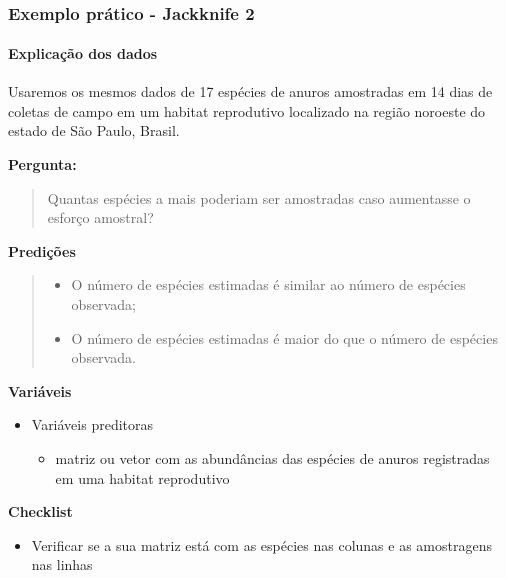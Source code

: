 \documentclass[
]{book}
\providecommand{\tightlist}{%
  \setlength{\itemsep}{0pt}\setlength{\parskip}{0pt}}
\begin{document}
~

\hypertarget{exemplo-pruxe1tico---jackknife-2}{%
\subsubsection{Exemplo prático - Jackknife 2}\label{exemplo-pruxe1tico---jackknife-2}}

\hypertarget{explicauxe7uxe3o-dos-dados-4}{%
\paragraph{Explicação dos dados}\label{explicauxe7uxe3o-dos-dados-4}}

Usaremos os mesmos dados de 17 espécies de anuros amostradas em 14 dias de coletas de campo em um habitat reprodutivo localizado na região noroeste do estado de São Paulo, Brasil.

\textbf{Pergunta:}

\begin{quote}
Quantas espécies a mais poderiam ser amostradas caso aumentasse o esforço amostral?
\end{quote}

\textbf{Predições}

\begin{quote}
\begin{itemize}
\tightlist
\item
  O número de espécies estimadas é similar ao número de espécies observada;
\item
  O número de espécies estimadas é maior do que o número de espécies observada.
\end{itemize}
\end{quote}

\textbf{Variáveis}

\begin{itemize}
\tightlist
\item
  Variáveis preditoras

  \begin{itemize}
  \tightlist
  \item
    matriz ou vetor com as abundâncias das espécies de anuros registradas em uma habitat reprodutivo
  \end{itemize}
\end{itemize}

\textbf{Checklist}

\begin{itemize}
\tightlist
\item
  Verificar se a sua matriz está com as espécies nas colunas e as amostragens nas linhas
\end{itemize}
\end{document}
